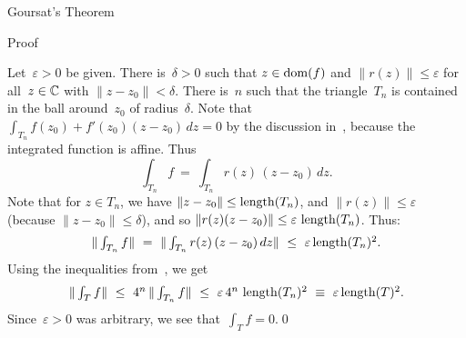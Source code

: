 \documentclass[main]{subfiles}
\begin{document}
\begin{parsec}
\begin{point}[goursat]{Goursat's Theorem}
\begin{point}[goursat-1]{Proof}
\begin{point}
Let~$\varepsilon >0$ be given.
There is~$\delta>0$
such that $z\in\operatorname{dom}(f)$
and $\|r(z)\|\leq \varepsilon$
for all~$z\in \mathbb{C}$ with $\|z-z_0\|<\delta$.
There is~$n$ such that the triangle~$T_n$ is contained
in the ball around~$z_0$ of radius~$\delta$.
Note that $\int_{T_n} f(z_0)+f'(z_0)(z-z_0)\,dz=0$
by the discussion in~, because
the integrated function is affine.
Thus
\begin{equation*}
\textstyle
\int_{T_n} f \  = \ \int_{T_n}r(z)\,(z-z_0)\,dz.
\end{equation*}
Note that for $z\in T_n$,
we have  $\|z-z_0\|\leq \operatorname{length}(T_n)$,
and $\|r(z)\|\leq \varepsilon$ (because $\|z-z_0\|\leq \delta$),
and so $\|r(z)(z-z_0)\|\leq \varepsilon\,\operatorname{length}(T_n)$.
Thus:
\begin{equation*}
\textstyle
\|\int_{T_n} f\| \  = \ \|\int_{T_n}r(z)\,(z-z_0)\,dz\|
\ \leq\ \varepsilon\operatorname{length}(T_n)^2.
\end{equation*}
Using the inequalities from~,
we get
\begin{equation*}
\textstyle
\|\int_T f\|\ \leq\ 4^n\, \|\int_{T_n} f\|
\ \leq\ \varepsilon \,4^n\,\operatorname{length}(T_n)^2 
\ \equiv\ \varepsilon \operatorname{length}(T)^2.
\end{equation*}
Since~$\varepsilon>0$ was arbitrary,
we see that~$\int_T f=0$.\qed
\end{point}
\end{point}



\end{point}
\end{parsec}
\end{document}
